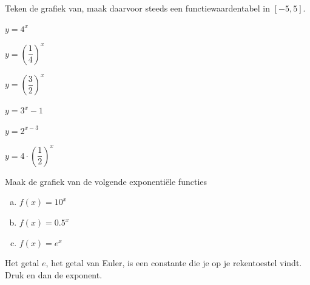 \documentclass[12pt,twoside,a4paper]{article}
\begin{document}
\begin{oefening}
Teken de grafiek van, maak daarvoor steeds een functiewaardentabel in $[-5,5]$.
\begin{exlist}{2}
  \item $y=4^x$
  \item $y=\left(\dfrac{1}{4}\right)^x$
  \item $y=\left(\dfrac{3}{2}\right)^x$
  \item $y=3^x-1$
  \item $y=2^{x-3}$
  \item $y=4\cdot \left(\dfrac{1}{2}\right)^x$
\end{exlist}
\end{oefening}

\begin{oefening}
Maak de grafiek van de volgende exponentiële functies
\begin{multicols}{3}
\begin{enumerate}[(a)]
  \item $f(x)=10^x$
  \item $f(x)=0.5^x$
  \item $f(x)=e^x$
\end{enumerate}
\end{multicols}
Het getal $e$, het getal van Euler, is een constante die je op je rekentoestel vindt. Druk   en dan de exponent.
\end{oefening}
\end{document}
